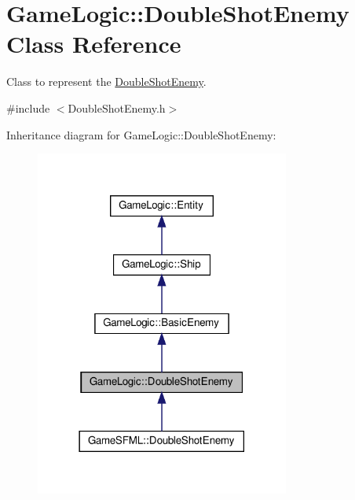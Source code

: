 \hypertarget{classGameLogic_1_1DoubleShotEnemy}{}\section{Game\+Logic\+:\+:Double\+Shot\+Enemy Class Reference}
\label{classGameLogic_1_1DoubleShotEnemy}


Class to represent the \hyperlink{classGameLogic_1_1DoubleShotEnemy}{Double\+Shot\+Enemy}.  




{\ttfamily \#include $<$Double\+Shot\+Enemy.\+h$>$}



Inheritance diagram for Game\+Logic\+:\+:Double\+Shot\+Enemy\+:
\nopagebreak
\begin{figure}[H]
\begin{center}
\leavevmode
\includegraphics[width=237pt]{classGameLogic_1_1DoubleShotEnemy__inherit__graph}
\end{center}
\end{figure}


